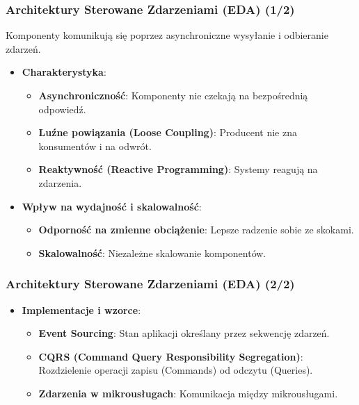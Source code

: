 \documentclass[aspectratio=169,xcolor=table]{beamer}
\begin{document}
\begin{frame}
  \frametitle{Architektury Sterowane Zdarzeniami (EDA) (1/2)}
  Komponenty komunikują się poprzez asynchroniczne wysyłanie i odbieranie zdarzeń.
  \begin{itemize}
    \item \textbf{Charakterystyka}:
        \begin{itemize}
            \item \textbf{Asynchroniczność}: Komponenty nie czekają na bezpośrednią odpowiedź.
            \item \textbf{Luźne powiązania (Loose Coupling)}: Producent nie zna konsumentów i na odwrót.
            \item \textbf{Reaktywność (Reactive Programming)}: Systemy reagują na zdarzenia.
        \end{itemize}
    \item \textbf{Wpływ na wydajność i skalowalność}:
        \begin{itemize}
            \item \textbf{Odporność na zmienne obciążenie}: Lepsze radzenie sobie ze skokami.
            \item \textbf{Skalowalność}: Niezależne skalowanie komponentów.
        \end{itemize}
  \end{itemize}
\end{frame}
\begin{frame}
  \frametitle{Architektury Sterowane Zdarzeniami (EDA) (2/2)}
  \begin{itemize}
    \item \textbf{Implementacje i wzorce}:
        \begin{itemize}
            \item \textbf{Event Sourcing}: Stan aplikacji określany przez sekwencję zdarzeń.
            \item \textbf{CQRS (Command Query Responsibility Segregation)}: Rozdzielenie operacji zapisu (Commands) od odczytu (Queries).
            \item \textbf{Zdarzenia w mikrousługach}: Komunikacja między mikrousługami.
        \end{itemize}
  \end{itemize}
\end{frame}
\end{document}

